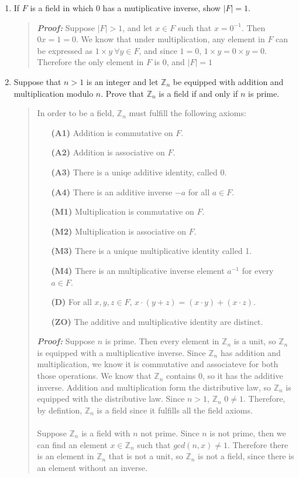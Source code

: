 \documentclass{hw}
\newcommand{\ZZ}{\mathbb{Z}}
\begin{document}
\begin{enumerate}
\item If $F$ is a field in which 0 has a mutiplicative inverse, show $|F|=1$.
\begin{quote}
\textbf{\textit{Proof:}} Suppose $|F|>1$, and let $x\in F$ such that $x=0^{-1}$. Then $0x=1=0$. We know that under multiplication, any element in $F$ can be expressed as $1\times y\ \forall y\in F$, and since $1=0$, $1\times y = 0 \times y = 0$. Therefore the only element in $F$ is 0, and $|F|=1$
\end{quote}

\item Suppose that $n>1$ is an integer and let $\ZZ_{n}$ be equipped with addition and multiplication modulo $n$. Prove that $\ZZ_{n}$ is a field if and only if $n$ is prime.
\begin{quote}
In order to be a field, $\ZZ_{n}$ must fulfill the following axioms:
\begin{enumerate}
\item[\textbf{(A1)}] Addition is commutative on $F$.
\item[\textbf{(A2)}] Addition is associative on $F$.
\item[\textbf{(A3)}] There is a uniqe additive identity, called 0.
\item[\textbf{(A4)}] There is an additive inverse $-a$ for all $a\in F$.
\item[\textbf{(M1)}] Multiplication is commutative on $F$.
\item[\textbf{(M2)}] Multiplication is associative on $F$.
\item[\textbf{(M3)}] There is a unique multiplicative identity called 1.
\item[\textbf{(M4)}] There is an multiplicative inverse element $a^{-1}$ for every $a\in F$.
\item[\textbf{(D)}] For all $x,y,z\in F$, $x\cdot(y+z)=(x\cdot y)+(x\cdot z)$.
\item[\textbf{(ZO)}] The additive and multiplicative identity are distinct.
\end{enumerate}

\textbf{\textit{Proof:}} Suppose $n$ is prime. Then every element in $\ZZ_{n}$ is a unit, so $\ZZ_{n}$ is equipped with a multiplicative inverse. Since $\ZZ_{n}$ has addition and multiplication, we know it is commutative and associateve for both those operations. We know that $\ZZ_{n}$ contains 0, so it has the additive inverse. Addition and multiplication form the distributive law, so $\ZZ_{n}$ is equipped with the distributive law. Since $n>1$, $\ZZ_{n}$ $0\neq1$. Therefore, by defintion, $\ZZ_{n}$ is a field since it fulfills all the field axioms.\\\\
Suppose $\ZZ_{n}$ is a field with $n$ not prime. Since $n$ is not prime, then we can find an element $x\in\ZZ_{n}$ such that $gcd(n,x)\neq1$. Therefore there is an element in $\ZZ_{n}$ that is not a unit, so $\ZZ_{n}$ is not a field, since there is an element without an inverse.
\end{quote}


\end{enumerate}
\end{document}
